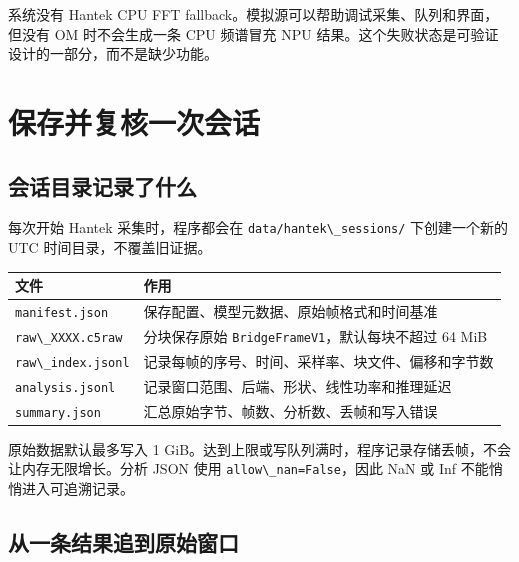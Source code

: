 系统没有 Hantek CPU FFT
fallback。模拟源可以帮助调试采集、队列和界面，但没有 OM 时不会生成一条
CPU 频谱冒充 NPU
结果。这个失败状态是可验证设计的一部分，而不是缺少功能。

\section{保存并复核一次会话}\label{src-experiment-case5-hantek-session}

\subsection{会话目录记录了什么}\label{src-experiment-case5-session-files}

每次开始 Hantek 采集时，程序都会在
\passthrough{\lstinline!data/hantek\_sessions/!} 下创建一个新的 UTC
时间目录，不覆盖旧证据。

\begin{longtable}[]{@{}
  >{\raggedright\arraybackslash}p{}
  >{\raggedright\arraybackslash}p{}@{}}
\toprule\noalign{}
\begin{minipage}[b]{\linewidth}\raggedright
文件
\end{minipage} & \begin{minipage}[b]{\linewidth}\raggedright
作用
\end{minipage} \\
\midrule\noalign{}
\endhead
\bottomrule\noalign{}
\endlastfoot
\passthrough{\lstinline!manifest.json!} &
保存配置、模型元数据、原始帧格式和时间基准 \\
\passthrough{\lstinline!raw\_XXXX.c5raw!} & 分块保存原始
\passthrough{\lstinline!BridgeFrameV1!}，默认每块不超过 64 MiB \\
\passthrough{\lstinline!raw\_index.jsonl!} &
记录每帧的序号、时间、采样率、块文件、偏移和字节数 \\
\passthrough{\lstinline!analysis.jsonl!} &
记录窗口范围、后端、形状、线性功率和推理延迟 \\
\passthrough{\lstinline!summary.json!} &
汇总原始字节、帧数、分析数、丢帧和写入错误 \\
\end{longtable}

原始数据默认最多写入 1
GiB。达到上限或写队列满时，程序记录存储丢帧，不会让内存无限增长。分析
JSON 使用 \passthrough{\lstinline!allow\_nan=False!}，因此 NaN 或 Inf
不能悄悄进入可追溯记录。

\subsection{从一条结果追到原始窗口}\label{src-experiment-case5-session-trace}

